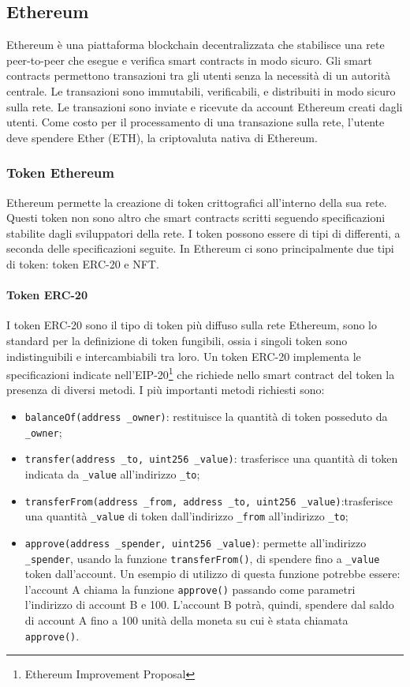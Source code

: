 \documentclass[a4paper]{article}
\begin{document}
    \subsection{Ethereum}
    Ethereum è una piattaforma blockchain decentralizzata che stabilisce una rete peer-to-peer che esegue e verifica smart contracts in modo sicuro.
    Gli smart contracts permettono transazioni tra gli utenti senza la necessità di un autorità centrale.
    Le transazioni sono immutabili, verificabili, e distribuiti in modo sicuro sulla rete. Le transazioni sono inviate e ricevute da account Ethereum creati dagli utenti.
    Come costo per il processamento di una transazione sulla rete, l'utente deve spendere Ether (ETH), la criptovaluta nativa di Ethereum\cite{ethereum}.
    \subsubsection{Token Ethereum}
    Ethereum permette la creazione di token crittografici all'interno della sua rete. Questi token non sono altro che smart contracts scritti seguendo specificazioni stabilite
    dagli sviluppatori della rete. I token possono essere di tipi di differenti, a seconda delle specificazioni seguite. In Ethereum ci sono principalmente due tipi di token: token ERC-20 e NFT.
    \paragraph{Token ERC-20}
    I token ERC-20 sono il tipo di token più diffuso sulla rete Ethereum, sono lo standard per la definizione di token fungibili\cite{erc20}, ossia i singoli token sono indistinguibili e intercambiabili tra loro.
    Un token ERC-20 implementa le specificazioni indicate nell'EIP-20\footnote{Ethereum Improvement Proposal} che richiede nello smart contract del token la presenza di diversi metodi. I più importanti metodi richiesti sono:
    \begin{itemize}
      \item \verb|balanceOf(address _owner)|: restituisce la quantità di token posseduto da \verb|_owner|;
      \item \verb|transfer(address _to, uint256 _value)|: trasferisce una quantità di token indicata da \verb|_value| all'indirizzo \verb|_to|;
      \item \verb|transferFrom(address _from, address _to, uint256 _value)|:\newline trasferisce una quantità \verb|_value| di token dall'indirizzo \verb|_from| all'indirizzo \verb|_to|;
      \item \verb|approve(address _spender, uint256 _value)|: permette all'indirizzo \verb|_spender|, usando la funzione \verb|transferFrom()|, di spendere fino a \verb|_value| token dall'account\cite{eip20}. Un esempio di utilizzo di questa funzione potrebbe essere:
            l'account A chiama la funzione \verb|approve()| passando come parametri l'indirizzo di account B e 100. L'account B potrà, quindi, spendere dal saldo di account A fino a 100 unità della moneta su cui è stata chiamata \verb|approve()|.
    \end{itemize}
\end{document}
